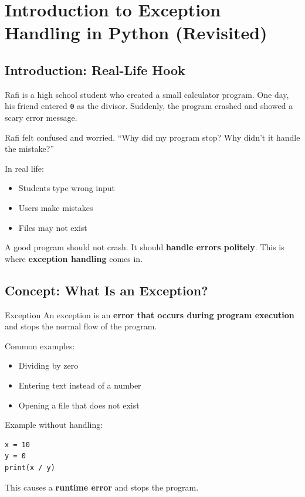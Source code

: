 \chapter{Introduction to Exception Handling in Python (Revisited)}

\section{Introduction: Real-Life Hook}

Rafi is a high school student who created a small calculator program.
One day, his friend entered \texttt{0} as the divisor.
Suddenly, the program crashed and showed a scary error message.

Rafi felt confused and worried.
``Why did my program stop? Why didn’t it handle the mistake?''

In real life:
\begin{itemize}
    \item Students type wrong input
    \item Users make mistakes
    \item Files may not exist
\end{itemize}

A good program should not crash.
It should \textbf{handle errors politely}.
This is where \textbf{exception handling} comes in.

\section{Concept: What Is an Exception?}

\begin{definition}{Exception}
An exception is an \textbf{error that occurs during program execution} and stops the normal flow of the program.
\end{definition}

Common examples:
\begin{itemize}
    \item Dividing by zero
    \item Entering text instead of a number
    \item Opening a file that does not exist
\end{itemize}

Example without handling:

\begin{verbatim}
x = 10
y = 0
print(x / y)
\end{verbatim}

This causes a \textbf{runtime error} and stops the program.

